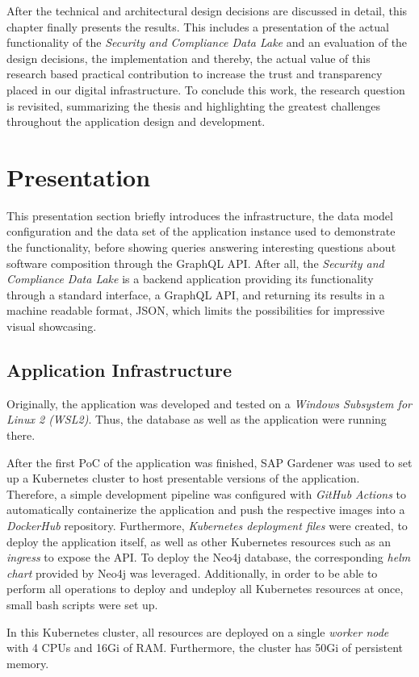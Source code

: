 
After the technical and architectural design decisions are discussed in detail, this chapter finally presents the results. This includes a presentation of the actual functionality of the \emph{Security and Compliance Data Lake} and an evaluation of the design decisions, the implementation and thereby, the actual value of this research based practical contribution to increase the trust and transparency placed in our digital infrastructure. To conclude this work, the research question is revisited, summarizing the thesis and highlighting the greatest challenges throughout the application design and development. 

\section{Presentation} \label{sec:Presentation}
This presentation section briefly introduces the infrastructure, the data model configuration and the data set of the application instance used to demonstrate the functionality, before showing queries answering interesting questions about software composition through the GraphQL API. After all, the \emph{Security and Compliance Data Lake} is a backend application providing its functionality through a standard interface, a GraphQL API, and returning its results in a machine readable format, JSON, which limits the possibilities for impressive visual showcasing.   

\subsection{Application Infrastructure}
Originally, the application was developed and tested on a \emph{Windows Subsystem for Linux 2 (WSL2)}. Thus, the database as well as the application were running there.\par
After the first PoC of the application was finished, SAP Gardener was used to set up a Kubernetes cluster to host presentable versions of the application. Therefore, a simple development pipeline was configured with \emph{GitHub Actions} to automatically containerize the application and push the respective images into a \emph{DockerHub} repository. Furthermore, \emph{Kubernetes deployment files} were created, to deploy the application itself, as well as other Kubernetes resources such as an \emph{ingress} to expose the API. To deploy the Neo4j database, the corresponding \emph{helm chart} provided by Neo4j was leveraged. Additionally, in order to be able to perform all operations to deploy and undeploy all Kubernetes resources at once, small bash scripts were set up.\par
In this Kubernetes cluster, all resources are deployed on a single \emph{worker node} with 4 CPUs and 16Gi of RAM. Furthermore, the cluster has 50Gi of persistent memory.

